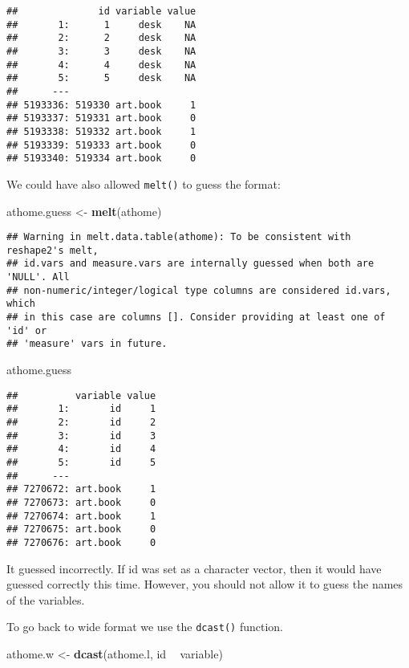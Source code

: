 \documentclass[]{book}
\newenvironment{Shaded}{\begin{snugshade}}{\end{snugshade}}
\newcommand{\KeywordTok}[1]{\textcolor[rgb]{0.13,0.29,0.53}{\textbf{#1}}}
\newcommand{\NormalTok}[1]{#1}
\newcommand{\OperatorTok}[1]{\textcolor[rgb]{0.81,0.36,0.00}{\textbf{#1}}}
\newcommand{\StringTok}[1]{\textcolor[rgb]{0.31,0.60,0.02}{#1}}
\begin{document}
\begin{verbatim}
##              id variable value
##       1:      1     desk    NA
##       2:      2     desk    NA
##       3:      3     desk    NA
##       4:      4     desk    NA
##       5:      5     desk    NA
##      ---                      
## 5193336: 519330 art.book     1
## 5193337: 519331 art.book     0
## 5193338: 519332 art.book     1
## 5193339: 519333 art.book     0
## 5193340: 519334 art.book     0
\end{verbatim}

We could have also allowed \texttt{melt()} to guess the format:

\begin{Shaded}
\begin{Highlighting}[]
\NormalTok{athome.guess <-}\StringTok{ }\KeywordTok{melt}\NormalTok{(athome)}
\end{Highlighting}
\end{Shaded}

\begin{verbatim}
## Warning in melt.data.table(athome): To be consistent with reshape2's melt,
## id.vars and measure.vars are internally guessed when both are 'NULL'. All
## non-numeric/integer/logical type columns are considered id.vars, which
## in this case are columns []. Consider providing at least one of 'id' or
## 'measure' vars in future.
\end{verbatim}

\begin{Shaded}
\begin{Highlighting}[]
\NormalTok{athome.guess}
\end{Highlighting}
\end{Shaded}

\begin{verbatim}
##          variable value
##       1:       id     1
##       2:       id     2
##       3:       id     3
##       4:       id     4
##       5:       id     5
##      ---               
## 7270672: art.book     1
## 7270673: art.book     0
## 7270674: art.book     1
## 7270675: art.book     0
## 7270676: art.book     0
\end{verbatim}

It guessed incorrectly. If id was set as a character vector, then it would have guessed correctly this time. However, you should not allow it to guess the names of the variables.

To go back to wide format we use the \texttt{dcast()} function.

\begin{Shaded}
\begin{Highlighting}[]
\NormalTok{athome.w <-}\StringTok{ }\KeywordTok{dcast}\NormalTok{(athome.l,}
\NormalTok{                  id }\OperatorTok{~}\StringTok{ }\NormalTok{variable)}
\end{Highlighting}
\end{Shaded}
\end{document}
